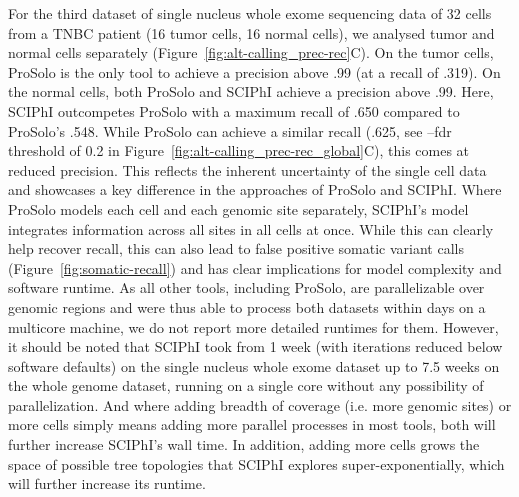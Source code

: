 \documentclass[12pt,inline]{wlscirep}
\begin{document}
For the third dataset of single nucleus whole exome sequencing data of 32 cells from a TNBC patient (16 tumor cells, 16 normal cells), we analysed tumor and normal cells separately (Figure~\ref{fig:alt-calling_prec-rec}C).
On the tumor cells, ProSolo is the only tool to achieve a precision above .99 (at a recall of .319).
On the normal cells, both ProSolo and SCIPhI achieve a precision above .99.
Here, SCIPhI outcompetes ProSolo with a maximum recall of .650 compared to ProSolo's .548.
While ProSolo can achieve a similar recall (.625, see {\ttfamily --fdr} threshold of 0.2 in Figure~\ref{fig:alt-calling_prec-rec_global}C), this comes at reduced precision.
This reflects the inherent uncertainty of the single cell data and showcases a key difference in the approaches of ProSolo and SCIPhI.
Where ProSolo models each cell and each genomic site separately, SCIPhI's model integrates information across all sites in all cells at once.
While this can clearly help recover recall, this can also lead to false positive somatic variant calls (Figure~\ref{fig:somatic-recall}) and has clear implications for model complexity and software runtime.
As all other tools, including ProSolo, are parallelizable over genomic regions and were thus able to process both datasets within days on a multicore machine, we do not report more detailed runtimes for them.
However, it should be noted that SCIPhI took from 1 week (with iterations reduced below software defaults) on the single nucleus whole exome dataset up to 7.5 weeks on the whole genome dataset, running on a single core without any possibility of parallelization.
And where adding breadth of coverage (i.e. more genomic sites) or more cells simply means adding more parallel processes in most tools, both will further increase SCIPhI's wall time.
In addition, adding more cells grows the space of possible tree topologies that SCIPhI explores super-exponentially\cite{lahnemann_eleven_2020}, which will further increase its runtime.
\end{document}
